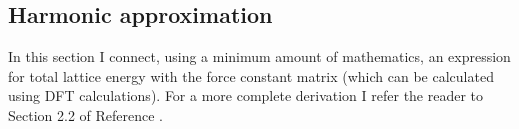 





\subsection{Harmonic approximation} \label{harmonicapprox}

In this section I connect, using a minimum amount of mathematics, an expression for total lattice energy with the force constant matrix (which can be calculated using DFT calculations). For a more complete derivation I refer the reader to Section 2.2 of Reference \cite{Hayes1985}.

